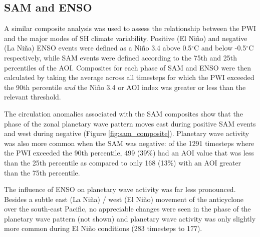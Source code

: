 \subsection{SAM and ENSO}

A similar composite analysis was used to assess the relationship between the PWI and the major modes of SH climate variability. Positive (El Ni\~{n}o) and negative (La Ni\~{n}a) ENSO events were defined as a Ni\~{n}o 3.4 above 0.5$^{\circ}$C and below -0.5$^{\circ}$C respectively, while SAM events were defined according to the 75th and 25th percentiles of the AOI. Composites for each phase of SAM and ENSO were then calculated by taking the average across all timesteps for which the PWI exceeded the 90th percentile \textit{and} the Ni\~{n}o 3.4 or AOI index was greater or less than the relevant threshold. 

The circulation anomalies associated with the SAM composites show that the phase of the zonal planetary wave pattern moves east during positive SAM events and west during negative (Figure \ref{fig:sam_composite}). Planetary wave activity was also more common when the SAM was negative: of the 1291 timesteps where the PWI exceeded the 90th percentile, 499 (39\%) had an AOI value that was less than the 25th percentile as compared to only 168 (13\%) with an AOI greater than the 75th percentile. 

The influence of ENSO on planetary wave activity was far less pronounced. Besides a subtle east (La Ni\~{n}a) / west (El Ni\~{n}o) movement of the anticyclone over the south-east Pacific, no appreciable changes were seen in the phase of the planetary wave pattern (not shown) and planetary wave activity was only slightly more common during El Ni\~{n}o conditions (283 timesteps to 177).      